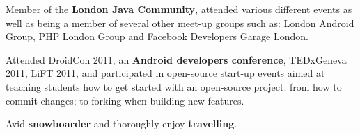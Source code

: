 \documentclass[]{friggeri-cv}
\begin{document}
Member of the \textbf{London Java Community}, attended various different events as well as being a member of several other meet-up groups such as: London Android Group, PHP London Group and Facebook Developers Garage London.

Attended DroidCon 2011, an \textbf{Android developers conference}, TEDxGeneva 2011, LiFT 2011, and participated in open-source start-up events aimed at teaching students how to get started with an open-source project: from how to commit changes; to forking when building new features.

Avid \textbf{snowboarder} and thoroughly enjoy \textbf{travelling}.
\end{document}
